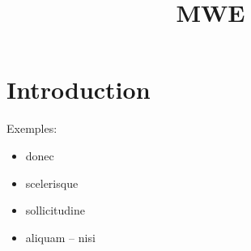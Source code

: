 \documentclass[a4paper,12pt]{article}
\title{MWE}
\author{}
\date{}
\begin{document}
\maketitle
\section{Introduction}

Exemples:
\begin{itemize}
    \item{} donec
    \item{} scelerisque
    \item{}  sollicitudine
    \item{} aliquam -- nisi
\end{itemize}
\end{document}
